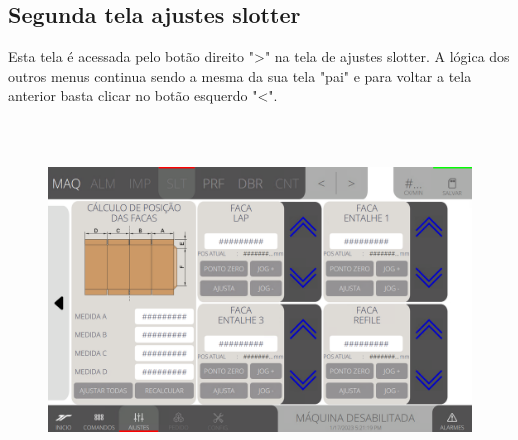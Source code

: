 \newpage
\thispagestyle{fancy}
\vspace*{40 pt}
\subsection{Segunda tela ajustes slotter}\label{telaAjustesSlotter2}
Esta tela é acessada pelo botão direito "\textgreater" na tela de ajustes slotter. A lógica dos outros menus continua sendo a mesma da sua tela "pai" e para voltar a tela anterior basta clicar no botão esquerdo "\textless{}".
\vspace*{\fill}
\begin{figure}[h]
  \centering
  \includegraphics[width=576px,height=360px]{src/imagesFlexo/05-slotter/settings/e-Tela-Principal-2.png}
\end{figure}
\vspace*{\fill}

\newpage
\thispagestyle{fancy}
\vspace*{40 pt}
